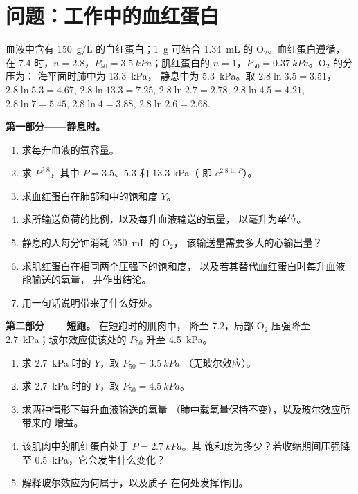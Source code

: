 \section{问题：工作中的血红蛋白}

\begin{problem}
\label{pb:b1:proteins:1}
血液中含有 \qty{150}{g/L} 的血红蛋白；\qty{1}{g} 可结合
\qty{1.34}{mL} 的 $\mathrm{O_2}$。血红蛋白遵循，
在  7.4 时，$n = 2.8$，$P_{50} = \qty{3.5}{kPa}$；肌红蛋白的
$n = 1$，$P_{50} = \qty{0.37}{kPa}$。$\mathrm{O_2}$ 的分压为：
海平面时肺中为 \qty{13.3}{kPa}，
静息中为 \qty{5.3}{kPa}。取 $2.8\ln 3.5 = 3.51$，
$2.8\ln 5.3 = 4.67$, $2.8\ln 13.3 = 7.25$, $2.8\ln 2.7 = 2.78$,
$2.8\ln 4.5 = 4.21$, $2.8\ln 7 = 5.45$, $2.8\ln 4 = 3.88$,
$2.8\ln 2.6 = 2.68$.

\medskip
\noindent\textbf{第一部分——静息时。}
\begin{enumerate}
  \item 求每升血液的氧容量。
  \item 求 $P^{2.8}$，其中 $P = 3.5$、$5.3$ 和 $13.3$ kPa（
        即 $e^{2.8\ln P}$）。
  \item 求血红蛋白在肺部和中的饱和度
        $Y$。
  \item 求所输送负荷的比例，以及每升血液输送的氧量，
        以毫升为单位。
  \item 静息的人每分钟消耗 \qty{250}{mL} 的 $\mathrm{O_2}$，
        该输送量需要多大的心输出量？
  \item 求肌红蛋白在相同两个压强下的饱和度，
        以及若其替代血红蛋白时每升血液能输送的氧量，
        并作出结论。
  \item 用一句话说明带来了什么好处。
\end{enumerate}

\medskip
\noindent\textbf{第二部分——短跑。}
在短跑时的肌肉中， 降至 7.2，局部
$\mathrm{O_2}$ 压强降至 \qty{2.7}{kPa}；玻尔效应使该处的 $P_{50}$ 升至
\qty{4.5}{kPa}。
\begin{enumerate}[resume]
  \item 求 \qty{2.7}{kPa} 时的 $Y$，取 $P_{50} = \qty{3.5}{kPa}$
        （无玻尔效应）。
  \item 求 \qty{2.7}{kPa} 时的 $Y$，取 $P_{50} = \qty{4.5}{kPa}$。
  \item 求两种情形下每升血液输送的氧量
        （肺中载氧量保持不变），以及玻尔效应所带来的
        增益。
  \item 该肌肉中的肌红蛋白处于 $P = \qty{2.7}{kPa}$。其
        饱和度为多少？若收缩期间压强降至
        \qty{0.5}{kPa}，它会发生什么变化？
  \item 解释玻尔效应为何属于，以及质子
        在何处发挥作用。
\end{enumerate}


\end{problem}
